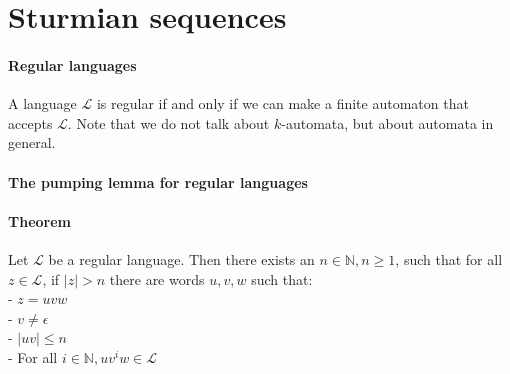 \documentclass{article}
\begin{document}
\section*{Sturmian sequences}
\paragraph{Regular languages}
A language $\mathcal{L}$ is regular if and only if we can make a finite
automaton that accepts $\mathcal{L}$. Note that we do not talk about
$k$-automata, but about automata in general.

\paragraph{The pumping lemma for regular languages}
\paragraph{Theorem}
Let $\mathcal{L}$ be a regular language. Then there exists an
$n \in \mathbb{N}, n \ge 1$, such that for all $z \in \mathcal{L}$, if
$|z| > n$ there are words $u, v, w$ such that:\\
- $z = uvw$\\
- $v \ne \epsilon$\\
- $|uv| \le n$\\
- For all $i \in \mathbb{N}, uv^iw \in \mathcal{L}$
\end{document}

